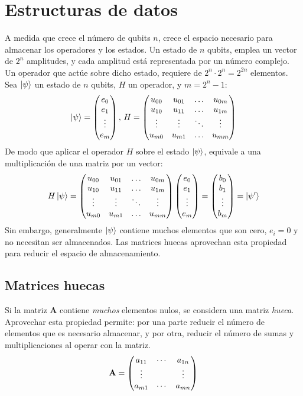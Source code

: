 \section{Estructuras de datos}
A medida que crece el número de qubits $n$, crece el espacio necesario para 
almacenar los operadores y los estados.
Un estado de $n$ qubits, emplea un vector de $2^{n}$ amplitudes, y cada amplitud 
está representada por un número complejo.  Un operador que actúe sobre dicho 
estado, requiere de $2^{n} \cdot 2^{n} = 2^{2n}$ elementos.  Sea $\ket{\psi}$ un 
estado de $n$ qubits, $H$ un operador, y $m = 2^{n}-1$:
%
$$ \ket{\psi} = \begin{pmatrix} e_0 \\ e_1 \\ \vdots \\ e_m \end{pmatrix},\, H =
	\begin{pmatrix}  u_{00} & u_{01} & \ldots & u_{0m} \\
		u_{10} & u_{11} & \ldots & u_{1m}\\
		\vdots & \vdots & \ddots & \vdots \\
		u_{m0} & u_{m1} & \ldots & u_{mm}\\
	 \end{pmatrix}
$$
%
De modo que aplicar el operador $H$ sobre el estado $\ket{\psi}$, equivale a una 
multiplicación de una matriz por un vector:
%
$$ H \ket{\psi} = \begin{pmatrix}  u_{00} & u_{01} & \ldots & u_{0m} \\
		u_{10} & u_{11} & \ldots & u_{1m}\\
		\vdots & \vdots & \ddots & \vdots \\
		u_{m0} & u_{m1} & \ldots & u_{mm}\\
	 \end{pmatrix}
	\begin{pmatrix} e_0 \\ e_1 \\ \vdots \\ e_m \end{pmatrix}
=
	\begin{pmatrix} b_0 \\ b_1 \\ \vdots \\ b_m \end{pmatrix} = \ket{\psi'}
$$
%
Sin embargo, generalmente $\ket{\psi}$ contiene muchos elementos que son cero, 
$e_i = 0$ y no necesitan ser almacenados. Las matrices huecas aprovechan esta 
propiedad para reducir el espacio de almacenamiento.

\subsection{Matrices huecas}

Si la matriz \textbf{A} contiene \textit{muchos} elementos nulos, se considera 
una matriz \textit{hueca}. Aprovechar esta propiedad permite: por una parte 
reducir el número de elementos que es necesario almacenar, y por otra, reducir 
el número de sumas y multiplicaciones al operar con la matriz.
$$ \textbf{A} = \begin{pmatrix}  a_{11} & \cdots & a_{1n} \\
		\vdots &   & \vdots \\
		a_{m1} & \cdots & a_{mn}\\
	 \end{pmatrix}
$$

